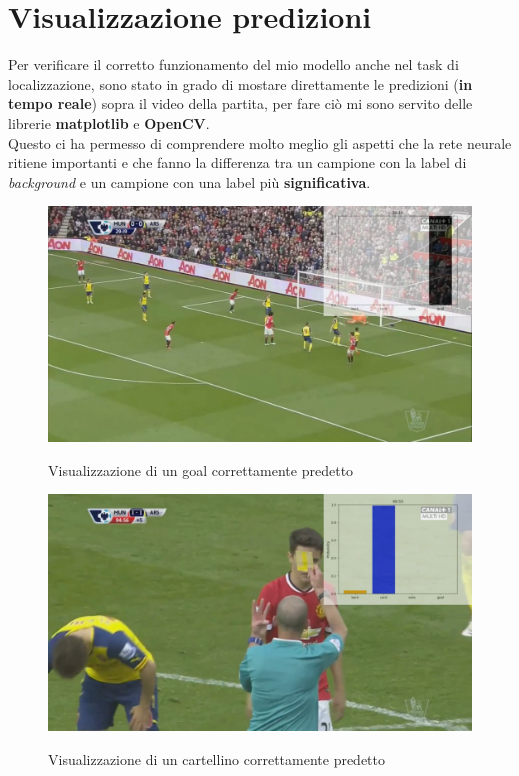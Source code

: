 \section{Visualizzazione predizioni}
Per verificare il corretto funzionamento del mio modello anche nel task di localizzazione, sono stato in grado di mostare direttamente le predizioni (\textbf{in tempo reale}) sopra il video della partita, per fare ciò mi sono servito delle librerie \textbf{matplotlib} e \textbf{OpenCV}.
\\Questo ci ha permesso di comprendere molto meglio gli aspetti che la rete neurale ritiene importanti e che fanno la differenza tra un campione con la label di \textit{background} e un campione con una label più \textbf{significativa}.

\begin{figure}[ht]
\centering
\caption{Visualizzazione di un goal correttamente predetto}
\includegraphics[width=\linewidth]{img/videogoalHQ.png}
\label{figure : videogoal}
\end{figure}
\begin{figure}[H]
\centering
\caption{Visualizzazione di un cartellino correttamente predetto}
\includegraphics[width=\linewidth]{img/videocardHQ.png}
\label{figure : videocard}
\end{figure}

